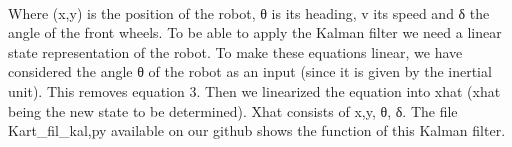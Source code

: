 \paragraph{}Where (x,y) is the position of the robot, θ is its heading, v its speed and δ the angle of the front wheels.
To be able to apply the Kalman filter we need a linear state representation of the robot. To make these equations linear, we have considered the angle θ of the robot as an input (since it is given by the inertial unit). This removes equation 3. Then we linearized the equation into xhat (xhat being the new state to be determined). Xhat consists of x,y, θ, δ. The file Kart_fil_kal,py available on our github shows the function of this Kalman filter.
